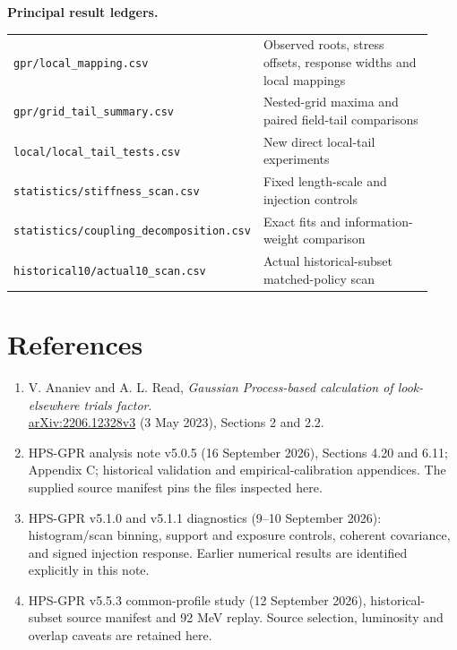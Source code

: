 \documentclass[11pt]{article}
\newcommand{\pageheading}[1]{\section*{\color{navy}#1}}
\begin{document}
\textbf{Principal result ledgers.}\par
{\small\begin{tabular}{>{\raggedright\arraybackslash}p{0.48\linewidth}>{\raggedright\arraybackslash}p{0.45\linewidth}}
\texttt{gpr/local\_mapping.csv} & Observed roots, stress offsets, response widths and local mappings\\
\texttt{gpr/grid\_tail\_summary.csv} & Nested-grid maxima and paired field-tail comparisons\\
\texttt{local/local\_tail\_tests.csv} & New direct local-tail experiments\\
\texttt{statistics/stiffness\_scan.csv} & Fixed length-scale and injection controls\\
\texttt{statistics/coupling\_decomposition.csv} & Exact fits and information-weight comparison\\
\texttt{historical10/actual10\_scan.csv} & Actual historical-subset matched-policy scan
\end{tabular}}

\pageheading{References}
\begin{enumerate}
\item V. Ananiev and A. L. Read, \textit{Gaussian Process-based calculation of look-elsewhere trials factor}.\\
\href{https://arxiv.org/pdf/2206.12328}{arXiv:2206.12328v3} (3 May 2023), Sections 2 and 2.2.
\item HPS-GPR analysis note v5.0.5 (16 September 2026), Sections 4.20 and 6.11; Appendix C; historical validation and empirical-calibration appendices. The supplied source manifest pins the files inspected here.
\item HPS-GPR v5.1.0 and v5.1.1 diagnostics (9--10 September 2026): histogram/scan binning, support and exposure controls, coherent covariance, and signed injection response. Earlier numerical results are identified explicitly in this note.
\item HPS-GPR v5.5.3 common-profile study (12 September 2026), historical-subset source manifest and 92 MeV replay. Source selection, luminosity and overlap caveats are retained here.
\end{enumerate}
\end{document}

